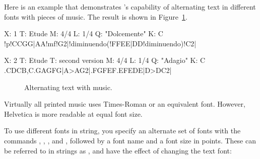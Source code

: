 \documentclass[a4paper,fullpage,12pt]{book}
\begin{document}
Here is an example that demonstrates \abcm{}'s capability of
alternating text in different fonts with pieces of music. The result
is shown in Figure~\ref{fig:typeset}.

{\small
\begin{abcsource}
%
X: 1
T: Etude
M: 4/4
L: 1/4
Q: "Dolcemente"
K: C
%
!p!CCGG|AA!mf!G2|!diminuendo(!FFEE|DD!diminuendo)!C2|

X: 2
T: Etude
T: second version
M: 4/4
L: 1/4
Q: "Adagio"
K: C
%
.C{DCB,}C.G{AGF}G|A>AG2|.F{GFE}F.E{FED}E|D>DC2|
\end{abcsource}
}

\begin{center}
\begin{figure}[htbp]
\caption{Alternating text with music.}
\label{fig:typeset}
\end{figure}
\end{center}

\begin{note}

  Virtually all printed music uses Times-Roman or an equivalent font.
  However, Helvetica is more readable at equal font size.

\end{note}

To use different fonts in string, you specify an alternate set of
fonts with the commands ,
, , and
, followed by a font name and a font size in
points. These can be referred to in strings as ,
and have the effect of changing the text font:
\end{document}
